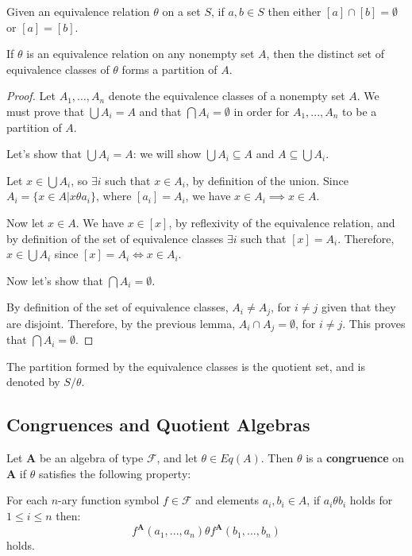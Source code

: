\begin{lemma} Given an equivalence relation $\theta$ on a set $S$, if $a,b \in
S$ then either $[a] \cap [b] = \emptyset$ or $[a] = [b]$.
\end{lemma}

\begin{theorem} If $\theta$ is an equivalence relation on any nonempty set $A$,
then the distinct set of equivalence classes of $\theta$ forms a partition of
$A$.
\end{theorem}

\begin{proof} Let $A_1, ...,A_n$ denote the equivalence classes of a nonempty
set $A$. We must prove that $\bigcup A_i = A$ and that $\bigcap A_i = \emptyset$
in order for $A_1, ...,A_n$ to be a partition of $A$.

Let's show that $\bigcup A_i = A$: we will show $\bigcup A_i \subseteq A$ and $A
\subseteq \bigcup A_i$.

Let $x \in \bigcup A_i$, so $\exists i$ such that $x \in A_i$, by definition of
the union. Since $A_i = \{x \in A | x \theta a_i\}$, where $[a_i] = A_i$, we
have $x \in A_i \implies x \in A$.

Now let $x \in A$. We have $x \in [x]$, by reflexivity of the equivalence
relation, and by definition of the set of equivalence classes $\exists i$ such
that $[x] = A_i$. Therefore, $x \in \bigcup A_i$ since $[x] = A_i \iff x \in
A_i$.

Now let's show that $\bigcap A_i = \emptyset$.

By definition of the set of equivalence classes, $A_i \neq A_j$, for $i \neq j$
given that they are disjoint. Therefore, by the previous lemma, $A_i \cap A_j =
\emptyset$, for $i \neq j$. This proves that $\bigcap A_i = \emptyset$.
\end{proof}

\begin{notation} The partition formed by the equivalence classes is the quotient
set, and is denoted by $S / \theta$.
\end{notation}

\subsection{Congruences and Quotient Algebras}

\begin{definition}[congruence] Let $\boldsymbol{A}$ be an algebra of type
$\mathcal{F}$, and let $\theta \in Eq(A)$. Then $\theta$ is a
\textbf{congruence} on $\boldsymbol{A}$ if $\theta$ satisfies the following
property:

  \begin{property}
    \label{prop:compatibility} For each $n$-ary function symbol $f \in
\mathcal{F}$ and elements $a_i, b_i \in A$, if $a_i \theta b_i$ holds for $1
\leq i \leq n$ then:
    $$f^{\boldsymbol{A}}(a_1,...,a_n) \theta f^{\boldsymbol{A}}(b_1,...,b_n)$$
    holds.
  \end{property}

\end{definition}


